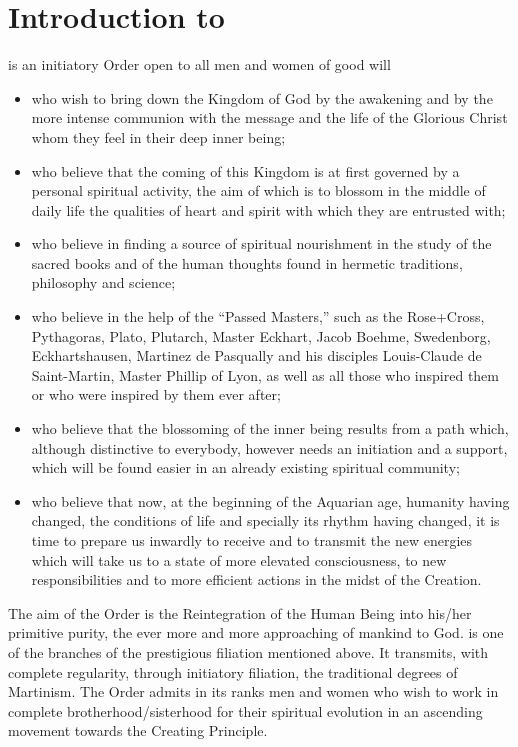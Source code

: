 \chapter{Introduction to \moup{}}

\mouplong{} is an initiatory Order open to all men and women of good will

\begin{itemize}
    \item who wish to bring down the Kingdom of God by the awakening and by the more intense communion with the message and the life of the Glorious Christ whom they feel in their deep inner being;
    \item who believe that the coming of this Kingdom is at first governed by a personal spiritual activity, the aim of which is to blossom in the middle of daily life the qualities of heart and spirit with which they are entrusted with;
    \item who believe in finding a source of spiritual nourishment in the study of the sacred books and of the human thoughts found in hermetic traditions, philosophy and science;
    \item who believe in the help of the ``Passed Masters,'' such as the Rose+Cross, Pythagoras, Plato, Plutarch, Master Eckhart, Jacob Boehme, Swedenborg, Eckhartshausen, Martinez de Pasqually and his disciples Louis-Claude de Saint-Martin, Master Phillip of Lyon, as well as all those who inspired them or who were inspired by them ever after;
    \item who believe that the blossoming of the inner being results from a path which, although distinctive to everybody, however needs an initiation and a support, which will be found easier in an already existing spiritual community;
    \item who believe that now, at the beginning of the Aquarian age, humanity having changed, the conditions of life and specially its rhythm having changed, it is time to prepare us inwardly to receive and to transmit the new energies which will take us to a state of more elevated consciousness, to new responsibilities and to more efficient actions in the midst of the Creation.
\end{itemize}

The aim of the Order is the Reintegration of the Human Being into his/her
primitive purity, the ever more and more approaching of mankind to God. \mouplong{} is one of the
branches of the prestigious filiation mentioned above. It transmits, with complete
regularity, through initiatory filiation, the traditional degrees of Martinism. The
Order admits in its ranks men and women who wish to work in complete
brotherhood/sisterhood for their spiritual evolution in an ascending movement
towards the Creating Principle.

